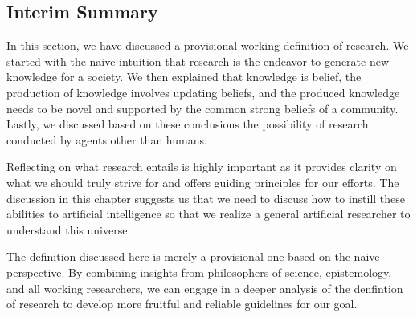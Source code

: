 

\subsection{Interim Summary}
In this section, we have discussed a provisional working definition of research. We started with the naive intuition that research is the endeavor to generate new knowledge for a society. We then explained that knowledge is belief, the production of knowledge involves updating beliefs, and the produced knowledge needs to be novel and supported by the common strong beliefs of a community. Lastly, we discussed based on these conclusions the possibility of research conducted by agents other than humans.

Reflecting on what research entails is highly important as it provides clarity on what we should truly strive for and offers guiding principles for our efforts. The discussion in this chapter suggests us that we need to discuss how to instill these abilities to artificial intelligence so that we realize a general artificial researcher to understand this universe.

The definition discussed here is merely a provisional one based on the naive perspective. By combining insights from philosophers of science, epistemology, and all working researchers, we can engage in a deeper analysis of the denfintion of research to develop more fruitful and reliable guidelines for our goal.

